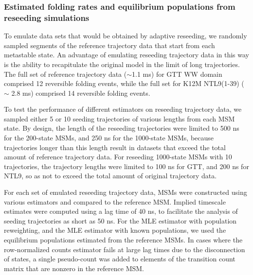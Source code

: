 \documentclass[%
 aip,
rsi,%
 amsmath,amssymb,
 reprint,%
]{revtex4-1}
\begin{document}
\subsubsection*{Estimated folding rates and equilibrium populations from reseeding simulations}

To emulate data sets that would be obtained by adaptive reseeding, we randomly sampled segments of the reference trajectory data that start from each metastable state.  An advantage of emulating reseeding trajectory data in this way is the ability to recapitulate the original model in the limit of long trajectories. The full set of reference trajectory data ($\sim$1.1 ms) for GTT WW domain comprised 12 reversible folding events, while the full set for K12M NTL9(1-39) ($\sim$ 2.8 ms) comprised 14 reversible folding events. 

To test the performance of different estimators on reseeding trajectory data, we sampled either 5 or 10 seeding trajectories of various lengths from each MSM state.  By design, the length of the reseeding trajectories were limited to 500 ns for the 200-state MSMs, and 250 ns for the 1000-state MSMs, because trajectories longer than this length result in datasets that exceed the total amount of reference trajectory data.  For reseeding 1000-state MSMs with 10 trajectories, the trajectory lengths were limited to 100 ns for GTT, and 200 ns for NTL9, so as not to exceed the total amount of original trajectory data.

For each set of emulated reseeding trajectory data, MSMs were constructed using various estimators and compared to the reference MSM. Implied timescale estimates were computed using a lag time of 40 ns, to facilitate the analysis of seeding trajectories as short as 50 ns. For the MLE estimator with population reweighting, and the MLE estimator with known populations, we used the equilibrium populations estimated from the reference MSMs.  In cases where the row-normalized counts estimator fails at large lag times due to the disconnection of states, a single pseudo-count was added to elements of the transition count matrix that are nonzero in the reference MSM.
\end{document}
